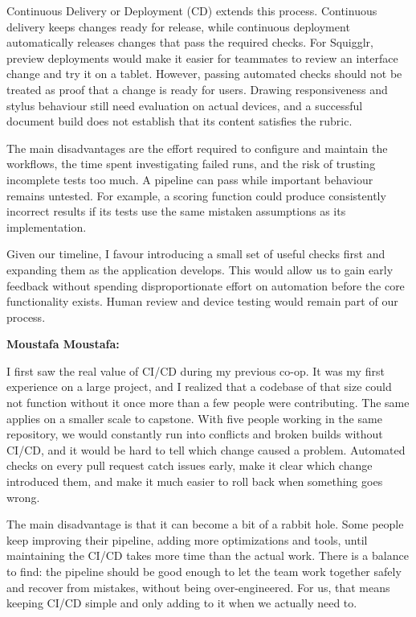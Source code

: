 \documentclass{article}
\begin{document}
\begin{enumerate}
    Continuous Delivery or Deployment (CD) extends this process.
    Continuous delivery keeps changes ready for release, while
    continuous deployment automatically releases changes that
    pass the required checks. For Squigglr, preview deployments
    would make it easier for teammates to review an interface
    change and try it on a tablet. However, passing automated
    checks should not be treated as proof that a change is ready
    for users. Drawing responsiveness and stylus behaviour still
    need evaluation on actual devices, and a successful document
    build does not establish that its content satisfies the
    rubric.

    The main disadvantages are the effort required to configure
    and maintain the workflows, the time spent investigating
    failed runs, and the risk of trusting incomplete tests too
    much. A pipeline can pass while important behaviour remains
    untested. For example, a scoring function could produce
    consistently incorrect results if its tests use the same
    mistaken assumptions as its implementation.

    Given our timeline, I favour introducing a small set of useful
    checks first and expanding them as the application develops.
    This would allow us to gain early feedback without spending
    disproportionate effort on automation before the core
    functionality exists. Human review and device testing would
    remain part of our process.

    \textbf{Moustafa Moustafa:}

    I first saw the real value of CI/CD during my previous co-op. It was
    my first experience on a large project, and I realized that a
    codebase of that size could not function without it once more
    than a few people were contributing. The same applies on a
    smaller scale to capstone. With five people working in the same
    repository, we would constantly run into conflicts and broken
    builds without CI/CD, and it would be hard to tell which change
    caused a problem. Automated checks on every pull request catch
    issues early, make it clear which change introduced them, and
    make it much easier to roll back when something goes wrong.

    The main disadvantage is that it can become a bit of a rabbit hole. Some
    people keep improving their pipeline, adding more optimizations
    and tools, until maintaining the CI/CD takes more time than the
    actual work. There is a balance to find: the pipeline should
    be good enough to let the team work together safely and recover
    from mistakes, without being over-engineered. For us, that means
    keeping CI/CD simple and only adding to it when we actually need
    to.


\end{enumerate}
\end{document}
